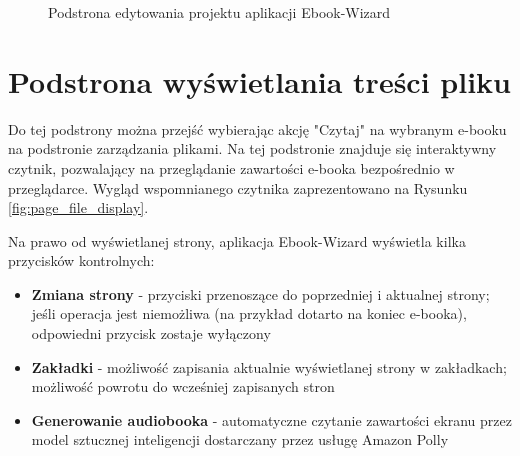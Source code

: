 \begin{figure}[h]
    \centering
    \setlength{\fboxsep}{0pt}
    \setlength{\fboxrule}{0.4pt}
    \caption{Podstrona edytowania projektu aplikacji Ebook-Wizard}
    \label{fig:page_project_editor}
\end{figure}

\section{Podstrona wyświetlania treści pliku}

Do tej podstrony można przejść wybierając akcję "Czytaj" na wybranym e-booku na podstronie zarządzania plikami. Na tej podstronie znajduje się interaktywny czytnik, pozwalający na przeglądanie zawartości e-booka bezpośrednio w przeglądarce. Wygląd wspomnianego czytnika zaprezentowano na Rysunku \ref{fig:page_file_display}.

Na prawo od wyświetlanej strony, aplikacja Ebook-Wizard wyświetla kilka przycisków kontrolnych:
\begin{itemize}
    \item \textbf{Zmiana strony} - przyciski przenoszące do poprzedniej i aktualnej strony; jeśli operacja jest niemożliwa (na przykład dotarto na koniec e-booka), odpowiedni przycisk zostaje wyłączony
    \item \textbf{Zakładki} - możliwość zapisania aktualnie wyświetlanej strony w zakładkach; możliwość powrotu do wcześniej zapisanych stron
    \item \textbf{Generowanie audiobooka} - automatyczne czytanie zawartości ekranu przez model sztucznej inteligencji dostarczany przez usługę Amazon Polly
\end{itemize}

